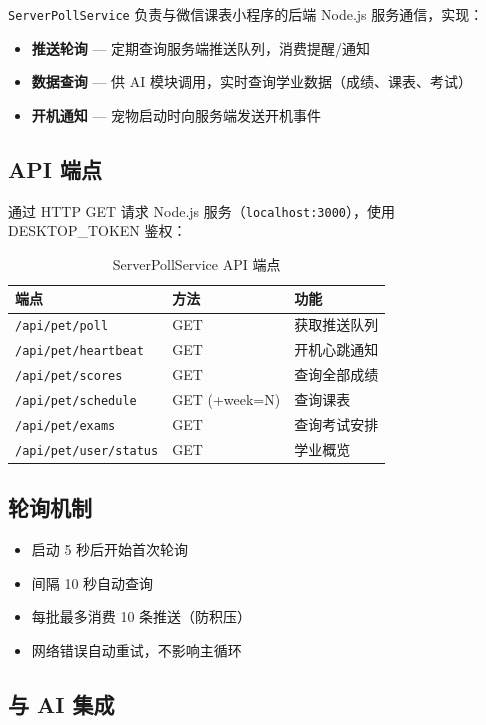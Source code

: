 \documentclass[12pt,a4paper]{ctexart}
\begin{document}
\texttt{ServerPollService} 负责与微信课表小程序的后端 Node.js 服务通信，实现：
\begin{itemize}
    \item \textbf{推送轮询} — 定期查询服务端推送队列，消费提醒/通知
    \item \textbf{数据查询} — 供 AI 模块调用，实时查询学业数据（成绩、课表、考试）
    \item \textbf{开机通知} — 宠物启动时向服务端发送开机事件
\end{itemize}

\subsection{API 端点}

通过 HTTP GET 请求 Node.js 服务（\texttt{localhost:3000}），使用 DESKTOP\_TOKEN 鉴权：

\begin{table}[H]
\centering
\caption{ServerPollService API 端点}
\label{tab:poll-api}
\begin{tabular}{lll}
\toprule
\textbf{端点} & \textbf{方法} & \textbf{功能} \\
\midrule
\texttt{/api/pet/poll} & GET & 获取推送队列 \\
\texttt{/api/pet/heartbeat} & GET & 开机心跳通知 \\
\texttt{/api/pet/scores} & GET & 查询全部成绩 \\
\texttt{/api/pet/schedule} & GET (+week=N) & 查询课表 \\
\texttt{/api/pet/exams} & GET & 查询考试安排 \\
\texttt{/api/pet/user/status} & GET & 学业概览 \\
\bottomrule
\end{tabular}
\end{table}

\subsection{轮询机制}

\begin{itemize}
    \item 启动 5 秒后开始首次轮询
    \item 间隔 10 秒自动查询
    \item 每批最多消费 10 条推送（防积压）
    \item 网络错误自动重试，不影响主循环
\end{itemize}

\subsection{与 AI 集成}
\end{document}
